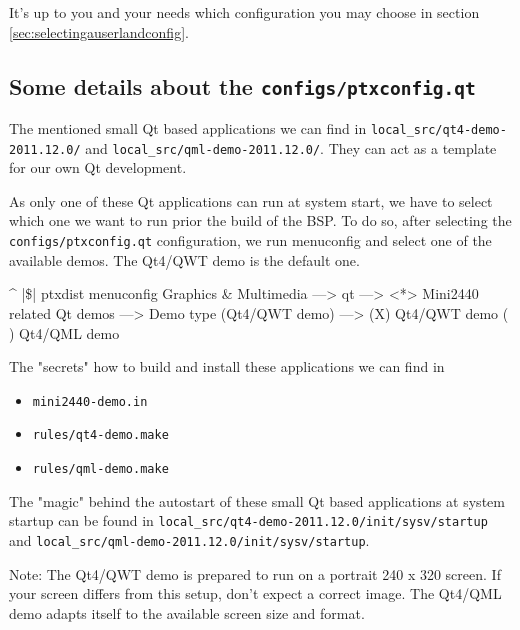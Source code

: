 It's up to you and your needs which configuration you may choose in section
\ref{sec:selectingauserlandconfig}.

\subsection{Some details about the \texttt{configs/ptxconfig.qt}}

The mentioned small Qt based applications we can find in
\texttt{local\_src/qt4-demo-2011.12.0/} and \texttt{local\_src/qml-demo-2011.12.0/}.
They can act as a template for our own Qt development.

As only one of these Qt applications can run at system start, we have to select
which one we want to run prior the build of the BSP. To do so, after selecting
the \texttt{configs/ptxconfig.qt} configuration, we run menuconfig and select
one of the available demos. The Qt4/QWT demo is the default one.

\begin{ptxshell}[escapechar=|]{^}
|\$| ptxdist menuconfig
  Graphics & Multimedia  --->
     qt --->
        <*> Mini2440 related Qt demos --->
           Demo type (Qt4/QWT demo) --->
              (X) Qt4/QWT demo
              ( ) Qt4/QML demo
\end{ptxshell}

The "secrets" how to build and install these applications we can find in

\begin{itemize}
	\item \texttt{mini2440-demo.in}
	\item \texttt{rules/qt4-demo.make}
	\item \texttt{rules/qml-demo.make}
\end{itemize}

The "magic" behind the autostart of these small Qt based applications at system
startup can be found in \texttt{local\_src/qt4-demo-2011.12.0/init/sysv/startup}
and \texttt{local\_src/qml-demo-2011.12.0/init/sysv/startup}.

Note: The Qt4/QWT demo is prepared to run on a portrait 240 x 320 screen. If
your screen differs from this setup, don't expect a correct image. The Qt4/QML
demo adapts itself to the available screen size and format.


\newcommand{\perDisplayName}{LCDN3502-23B (N35)}
\newcommand{\perDisplayRes}{240x320}

